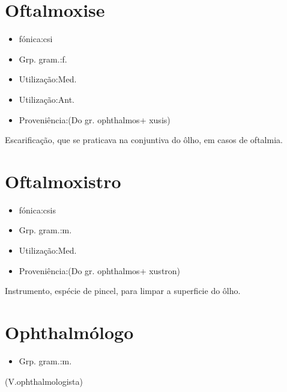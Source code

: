 \section{Oftalmoxise}
\begin{itemize}
\item {fónica:csi}
\end{itemize}
\begin{itemize}
\item {Grp. gram.:f.}
\end{itemize}
\begin{itemize}
\item {Utilização:Med.}
\end{itemize}
\begin{itemize}
\item {Utilização:Ant.}
\end{itemize}
\begin{itemize}
\item {Proveniência:(Do gr. \textunderscore ophthalmos\textunderscore  + \textunderscore xusis\textunderscore )}
\end{itemize}
Escarificação, que se praticava na conjuntiva do ôlho, em casos de oftalmia.
\section{Oftalmoxistro}
\begin{itemize}
\item {fónica:csis}
\end{itemize}
\begin{itemize}
\item {Grp. gram.:m.}
\end{itemize}
\begin{itemize}
\item {Utilização:Med.}
\end{itemize}
\begin{itemize}
\item {Proveniência:(Do gr. \textunderscore ophthalmos\textunderscore  + \textunderscore xustron\textunderscore )}
\end{itemize}
Instrumento, espécie de pincel, para limpar a superficie do ôlho.
\section{Ophthalmólogo}
\begin{itemize}
\item {Grp. gram.:m.}
\end{itemize}
(V.ophthalmologista)
